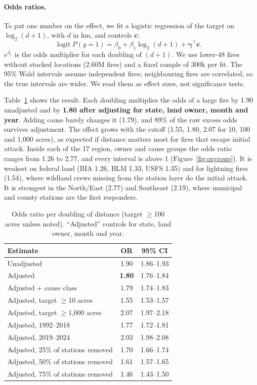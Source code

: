 \documentclass[10pt,twocolumn,letterpaper]{article}
\begin{document}
\paragraph{Odds ratios.} To put one number on the effect, we fit a logistic regression of the target on $\log_2(d+1)$, with $d$ in km, and controls $\mathbf{c}$:
\begin{equation}
\operatorname{logit} P(y=1) = \beta_0 + \beta_1 \log_2(d+1) + \boldsymbol{\gamma}^\top\mathbf{c}.
\end{equation}
$e^{\beta_1}$ is the odds multiplier for each doubling of $(d+1)$. We use lower-48 fires without stacked locations (2.60M fires) and a fixed sample of 300k per fit. The 95\% Wald intervals assume independent fires; neighbouring fires are correlated, so the true intervals are wider. We read them as effect sizes, not significance tests.

Table~\ref{tab:or} shows the result. Each doubling multiplies the odds of a large fire by 1.90 unadjusted and by \textbf{1.80 after adjusting for state, land owner, month and year}. Adding cause barely changes it (1.79), and 89\% of the raw excess odds survives adjustment. The effect grows with the cutoff (1.55, 1.80, 2.07 for 10, 100 and 1{,}000 acres), as expected if distance matters most for fires that escape initial attack. Inside each of the 17 region, owner and cause groups the odds ratio ranges from 1.26 to 2.77, and every interval is above 1 (Figure~\ref{fig:orgroup}). It is weakest on federal land (BIA 1.26, BLM 1.33, USFS 1.35) and for lightning fires (1.54), where wildland crews missing from the station layer do the initial attack. It is strongest in the North/East (2.77) and Southeast (2.19), where municipal and county stations are the first responders.

\begin{table}[tb]
\centering\footnotesize
\caption{Odds ratio per doubling of distance (target $\geq$100 acres unless noted). ``Adjusted'' controls for state, land owner, month and year.}
\label{tab:or}
\begin{tabularx}{\columnwidth}{@{}Xcc@{}}
\toprule
Estimate & OR & 95\% CI \\
\midrule
Unadjusted & 1.90 & 1.86--1.93 \\
Adjusted & \textbf{1.80} & 1.76--1.84 \\
Adjusted + cause class & 1.79 & 1.74--1.83 \\
\midrule
Adjusted, target $\geq$10 acres & 1.55 & 1.53--1.57 \\
Adjusted, target $\geq$1{,}000 acres & 2.07 & 1.97--2.18 \\
\midrule
Adjusted, 1992--2018 & 1.77 & 1.72--1.81 \\
Adjusted, 2019--2024 & 2.03 & 1.98--2.08 \\
\midrule
Adjusted, 25\% of stations removed & 1.70 & 1.66--1.74 \\
Adjusted, 50\% of stations removed & 1.61 & 1.57--1.65 \\
Adjusted, 75\% of stations removed & 1.46 & 1.43--1.50 \\
\bottomrule
\end{tabularx}
\end{table}
\end{document}
